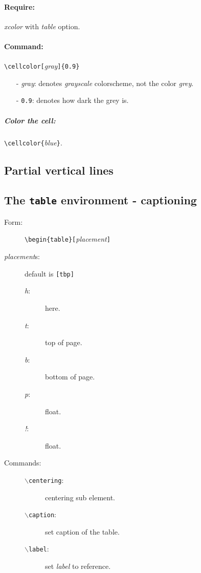 \paragraph{Require:} \emph{xcolor} with \emph{table} option.
\paragraph{Command:} \verb|\cellcolor[|\emph{gray}\verb|]{0.9}|
\begin{itemize}
	\item[-] \emph{gray}: denotes \emph{grayscale} colorscheme, not the color \emph{grey}.
	\item[-] \verb|0.9|: denotes how dark the grey is.
\end{itemize}
\subparagraph{Color the cell:} \verb|\cellcolor{|\emph{blue}\verb|}|.

\subsection{Partial vertical lines}

\subsection[\texttt{table}]{The \texttt{table} environment - captioning}
\begin{description}
	\item[Form:] \verb|\begin{table}[|\emph{placement}\verb|]|
	\item[\emph{placement}s:] default is \verb|[tbp]|\hfill
		\begin{description}
			\item[\emph{h}:] here.
			\item[\emph{t}:] top of page.
			\item[\emph{b}:] bottom of page.
			\item[\emph{p}:] float.
			\item[\emph{!}:] float.
		\end{description}
	\item[Commands:] \hfill
		\begin{description}
			\item[\texttt{$\backslash$centering}:] centering sub element.
			\item[\texttt{$\backslash$caption}:] set caption of the table.
			\item[\texttt{$\backslash$label}:] set \emph{label} to reference.
		\end{description}
\end{description}

